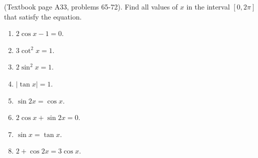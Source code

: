 (Textbook page A33, problems 65-72).
Find all values of $x$ in the interval $[0,2\pi]$ that satisfy the 
equation.
\begin{multicols}{2}
\begin{enumerate}
\item $2\cos x - 1=0$. \\  
\item $3\cot^2 x= 1$. \\ 
\item $2\sin^2 x= 1$. \\ 
\item $|\tan x|=1 $. \\ 
\item $\sin 2x = \cos x $.  \\ 
\item $2\cos x +\sin 2x=0$.\\ 
\item $\sin x =\tan x$. \\ 
\item $2+\cos 2x = 3 \cos x$. \\ 
\end{enumerate}
\end{multicols}

